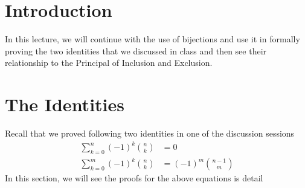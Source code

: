 
\section{Introduction}
In this lecture, we will continue with the use of bijections and use it in formally proving the two identities that we discussed in class and then see their relationship to the Principal of Inclusion and Exclusion. 

\section{The Identities}
Recall that we proved following two identities in one of the discussion sessions
\begin{align}
     \sum_{k=0}^n (-1)^k{n\choose k} &= 0 \label{REV1}\\ 
     \sum_{k=0}^m (-1)^k{n\choose k} &= (-1)^m{n-1\choose m} \label{REV2}
\end{align}
In this section, we will see the proofs for the above equations is detail
